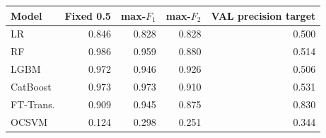 \begin{tabular}{@{}l r r r r@{}}
\toprule
Model & Fixed 0.5 & max-$F_1$ & max-$F_2$ & VAL precision target \\
\midrule
LR & 0.846 & 0.828 & 0.828 & 0.500 \\
RF & 0.986 & 0.959 & 0.880 & 0.514 \\
LGBM & 0.972 & 0.946 & 0.926 & 0.506 \\
CatBoost & 0.973 & 0.973 & 0.910 & 0.531 \\
FT-Trans. & 0.909 & 0.945 & 0.875 & 0.830 \\
OCSVM & 0.124 & 0.298 & 0.251 & 0.344 \\
\bottomrule
\end{tabular}
